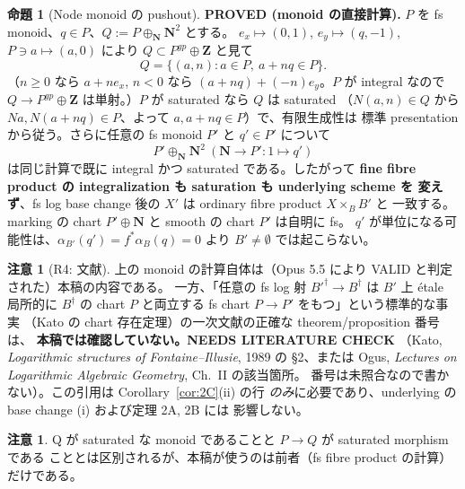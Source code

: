 \documentclass[11pt,a4paper]{article}
\numberwithin{equation}{section}
\theoremstyle{definition}
\newtheorem{proposition}[definition]{命題}
\newtheorem{remark}[definition]{注意}
\begin{document}
\begin{proposition}[Node monoid の pushout]\label{prop:fs}
\textbf{PROVED (monoid の直接計算).}
$P$ を fs monoid、$q\in P$、$Q:=P\oplus_{\mathbf N}\mathbf N^2$ とする。
$e_x\mapsto(0,1)$, $e_y\mapsto(q,-1)$, $P\ni a\mapsto(a,0)$ により
$Q\subset P^{gp}\oplus\mathbf Z$ と見て
\begin{equation}\label{eq:I1}
  Q=\{(a,n):a\in P,\ a+nq\in P\}.
\end{equation}
（$n\ge0$ なら $a+ne_x$, $n<0$ なら $(a+nq)+(-n)e_y$。$P$ が integral なので
$Q\to P^{gp}\oplus\mathbf Z$ は単射。）$P$ が saturated なら $Q$ は saturated
（$N(a,n)\in Q$ から $Na,N(a+nq)\in P$、よって $a,a+nq\in P$）で、有限生成性は
標準 presentation から従う。さらに任意の fs monoid $P'$ と $q'\in P'$ について
\[
  P'\oplus_{\mathbf N}\mathbf N^2\ (\mathbf N\to P':1\mapsto q')
\]
は同じ計算で既に integral かつ saturated である。したがって
\textbf{fine fibre product の integralization も saturation も underlying scheme を
変えず}、fs log base change 後の $X'$ は ordinary fibre product $X\times_BB'$ と
一致する。marking の chart $P'\oplus\mathbf N$ と smooth の chart $P'$ は自明に fs。
$q'$ が単位になる可能性は、$\alpha_{B'}(q')=f^*\alpha_B(q)=0$ より
$B'\neq\emptyset$ では起こらない。
\end{proposition}

\begin{remark}[R4: 文献]\label{rem:R4}
上の monoid の計算自体は（Opus 5.5 により VALID と判定された）本稿の内容である。
一方、「任意の fs log 射 $B'^\dagger\to B^\dagger$ は $B'$ 上 étale 局所的に
$B^\dagger$ の chart $P$ と両立する fs chart $P\to P'$ をもつ」という標準的な事実
（Kato の chart 存在定理）の一次文献の正確な theorem/proposition 番号は、
\textbf{本稿では確認していない。NEEDS LITERATURE CHECK}
（Kato, \emph{Logarithmic structures of Fontaine--Illusie}, 1989 の §2、または
Ogus, \emph{Lectures on Logarithmic Algebraic Geometry}, Ch.~II の該当箇所。
番号は未照合なので書かない）。この引用は Corollary~\ref{cor:2C}(ii) の行
\emph{のみ}に必要であり、underlying の base change (i) および定理 2A, 2B には
影響しない。
\end{remark}

\begin{remark}
Q が saturated な monoid であることと $P\to Q$ が saturated morphism である
こととは区別されるが、本稿が使うのは前者（fs fibre product の計算）だけである。
\end{remark}

\end{document}
